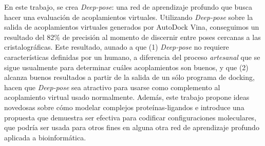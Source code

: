 En este trabajo, se crea \textit{Deep-pose}: una red de aprendizaje
profundo que busca hacer una evaluación de acoplamientos virtuales.
Utilizando \textit{Deep-pose} sobre la salida de acoplamientos
virtuales generados por AutoDock Vina, conseguimos un resultado del
82\% de precisión al momento de discernir entre poses cercanas a las
cristalográficas. Este resultado, aunado a que (1) \textit{Deep-pose}
no requiere características definidas por un humano, a diferencia del
proceso \textit{artesanal} que se sigue usualmente para determinar
cuáles acoplamientos son buenos, y que (2) alcanza buenos resultados a
partir de la salida de un sólo programa de docking, hacen que
\textit{Deep-pose} sea atractivo para usarse como complemento al
acoplamiento virtual usado normalmente. Además, este trabajo propone
ideas novedosas sobre cómo modelar complejos proteínas-ligandos e
introduce una propuesta que demuestra ser efectiva para codificar
configuraciones moleculares, que podría ser usada para otros fines en
alguna otra red de aprendizaje profundo aplicada a bioinformática.
